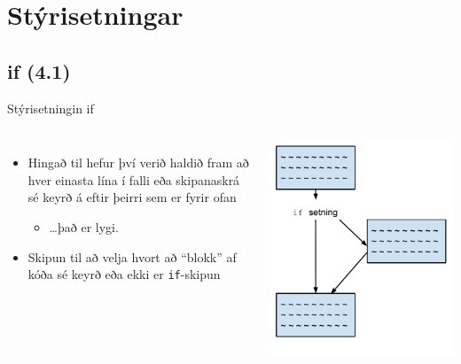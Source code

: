 \documentclass{beamer}
\begin{document}
\section{Stýrisetningar}

\subsection{if (4.1)}

\begin{frame}{Stýrisetningin if}
\begin{columns}
\begin{itemize}
 \item Hingað til hefur því verið haldið fram að hver einasta lína í falli eða skipanaskrá sé keyrð á eftir þeirri sem er fyrir ofan \pause
 \begin{itemize}
  \item \ldots það er lygi. \pause
 \end{itemize}
 \item Skipun til að velja hvort að ``blokk'' af kóða sé keyrð eða ekki er \texttt{if}-skipun
\end{itemize}
\begin{center}
 \includegraphics[width=0.8\linewidth]{Pics/if}
\end{center}
\end{columns}
\end{frame}
\end{document}
